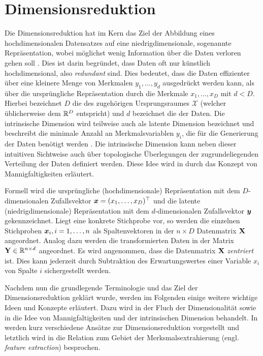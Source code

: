 \chapter{Dimensionsreduktion}
\label{ch:Dimensionsreduktion}

Die Dimensionsreduktion hat im Kern das Ziel der Abbildung eines hochdimensionalen Datensatzes auf
eine niedrigdimensionale, sogenannte  Repräsentation, wobei möglichst wenig
Information über die Daten verloren gehen soll \parencite[2]{Lee.2007}. Dies ist darin begründet, dass Daten oft nur künstlich hochdimensional, also
\textit{redundant} sind. Dies bedeutet, dass die Daten effizienter über eine kleinere Menge von
Merkmalen $y_1,\ldots,y_d$ ausgedrückt werden kann, als über die ursprüngliche Repräsentation durch
die Merkmale $x_1,\ldots,x_D$ mit $d < D$. Hierbei bezeichnet $D$ die  des zugehörigen Ursprungsraumes $\mathcal{X}$ (welcher üblicherweise dem $\mathbb{R}^D$
entspricht) und $d$ bezeichnet die  der Daten. Die intrinsische
Dimension wird teilweise auch als latente Dimension bezeichnet und beschreibt die minimale Anzahl
an Merkmalsvariablen $y_i$, die für die Generierung der Daten benötigt werden \parencite[47]{Lee.2007}. Die intrinsische Dimension kann neben dieser intuitiven Sichtweise auch über
topologische Überlegungen der zugrundeliegenden Verteilung der Daten definiert werden. Diese Idee
wird in  durch das Konzept von
Mannigfaltigkeiten erläutert.

Formell wird die ursprüngliche (hochdimensionale) Repräsentation mit dem $D$-dimensionalen
Zufallsvektor $\bm{x} = (x_1, \ldots, x_D)^\top$ und die latente (niedrigdimensionale)
Repräsentation mit dem $d$-dimensionalen Zufallsvektor $\bm{y}$ gekennzeichnet. Liegt eine
konkrete Stichprobe vor, so werden die einzelnen Stichproben $\bm{x}_i, i = 1,\ldots,n$ als
Spaltenvektoren in der $n \times D$ Datenmatrix $\mathbf{X}$ angeordnet. Analog dazu werden die
transformierten Daten in der Matrix $\mathbf{Y} \in \mathbb{R}^{n \times d}$ angeordnet. Es wird
angenommen, dass die Datenmatrix $\mathbf{X}$ \textit{zentriert} ist. Dies kann jederzeit durch
Subtraktion des Erwartungswertes einer Variable $x_i$ von Spalte $i$ sichergestellt werden.

Nachdem nun die grundlegende Terminologie und das Ziel der Dimensionsreduktion geklärt wurde,
werden im Folgenden einige weitere wichtige Ideen und Konzepte erläutert. Dazu wird in
 der Fluch der Dimensionalität sowie in
 die Idee von Mannigfaltigkeiten und
der intrinsischen Dimension behandelt. In  werden kurz
verschiedene Ansätze zur Dimensionsreduktion vorgestellt und letztlich wird in
 die Relation zum Gebiet der
Merksmalsextrahierung (engl. \textit{feature extraction}) besprochen.
